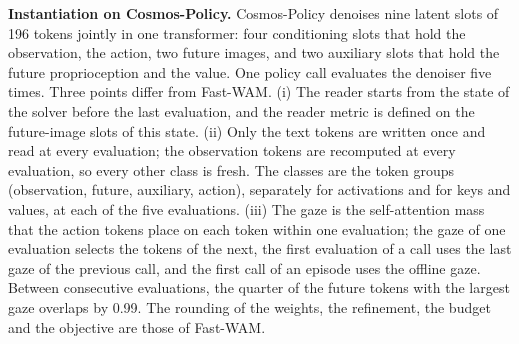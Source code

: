 \noindent\textbf{Instantiation on Cosmos-Policy.}
Cosmos-Policy denoises nine latent slots of 196 tokens jointly in one transformer: four conditioning slots that hold the observation, the action, two future images, and two auxiliary slots that hold the future proprioception and the value.
One policy call evaluates the denoiser five times.
Three points differ from Fast-WAM.
(i) The reader starts from the state of the solver before the last evaluation, and the reader metric is defined on the future-image slots of this state.
(ii) Only the text tokens are written once and read at every evaluation; the observation tokens are recomputed at every evaluation, so every other class is fresh.
The classes are the token groups (observation, future, auxiliary, action), separately for activations and for keys and values, at each of the five evaluations.
(iii) The gaze is the self-attention mass that the action tokens place on each token within one evaluation; the gaze of one evaluation selects the tokens of the next, the first evaluation of a call uses the last gaze of the previous call, and the first call of an episode uses the offline gaze.
Between consecutive evaluations, the quarter of the future tokens with the largest gaze overlaps by 0.99.
The rounding of the weights, the refinement, the budget and the objective are those of Fast-WAM.

